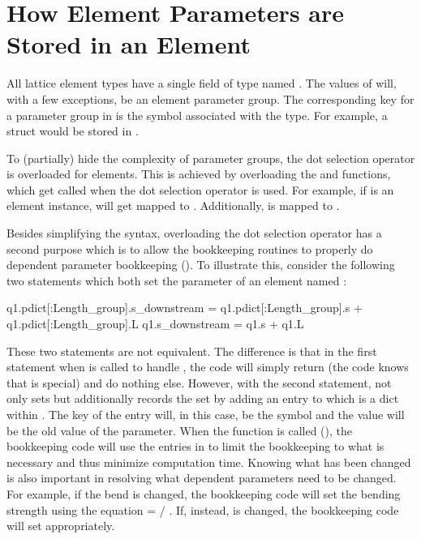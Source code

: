 \section{How Element Parameters are Stored in an Element}
\label{s:ele.access}

All lattice element types have a single field of type  named .
The values of  will, with a few exceptions, be an
element parameter group. The corresponding key for a parameter group in  is the symbol associated 
with the type. For example, a  struct would be stored in .

To (partially) hide the complexity of parameter groups, the dot selection operator is overloaded for elements.
This is achieved by overloading the  and  functions, 
which get called when the dot selection operator is used.
For example, if  is an element instance,  will get mapped to .
Additionally,  is mapped to .

Besides simplifying the syntax, overloading the dot selection operator has a second purpose which
is to allow the \accellat bookkeeping routines to properly do dependent parameter bookkeeping ().
To illustrate this, consider the following two statements which both set the 
parameter of an element named :
\begin{example}
  q1.pdict[:Length_group].s_downstream = q1.pdict[:Length_group].s + 
                                                     q1.pdict[:Length_group].L
  q1.s_downstream = q1.s + q1.L
\end{example}
These two statements are not equivalent. The difference is that in the first statement when
 is called to handle , the code will simply return  
(the code knows that  is special) and do nothing else. 
However, with the second statement,  not only sets
 but additionally records the set by adding an entry to
 which is a dict within . 
The key of the entry will, in this case, be the symbol  
and the value will be the old value of the parameter. 
When the  function is called (), the bookkeeping code will use the
entries in  to limit the bookkeeping to what is necessary and thus
minimize computation time. 
Knowing what has been changed is also important in resolving what
dependent parameters need to be changed. 
For example, if the bend  is changed, the bookkeeping code will set the 
bending strength  using the equation  =  / . If, instead,
 is changed, the bookkeeping code will set  appropriately. 

